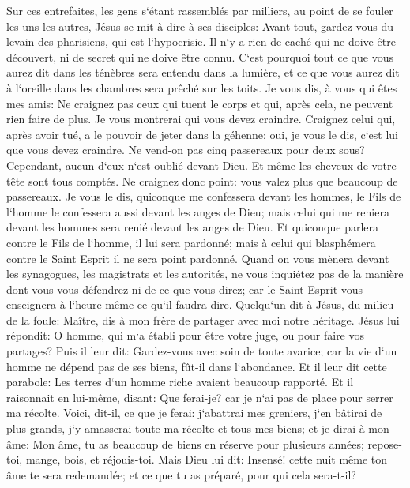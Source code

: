 \verse Sur ces entrefaites, les gens s`étant rassemblés par milliers, au point de se fouler les uns les autres, Jésus se mit à dire à ses disciples: Avant tout, gardez-vous du levain des pharisiens, qui est l`hypocrisie. 
\verse Il n`y a rien de caché qui ne doive être découvert, ni de secret qui ne doive être connu. 
\verse C`est pourquoi tout ce que vous aurez dit dans les ténèbres sera entendu dans la lumière, et ce que vous aurez dit à l`oreille dans les chambres sera prêché sur les toits. 
\verse Je vous dis, à vous qui êtes mes amis: Ne craignez pas ceux qui tuent le corps et qui, après cela, ne peuvent rien faire de plus. 
\verse Je vous montrerai qui vous devez craindre. Craignez celui qui, après avoir tué, a le pouvoir de jeter dans la géhenne; oui, je vous le dis, c`est lui que vous devez craindre. 
\verse Ne vend-on pas cinq passereaux pour deux sous? Cependant, aucun d`eux n`est oublié devant Dieu. 
\verse Et même les cheveux de votre tête sont tous comptés. Ne craignez donc point: vous valez plus que beaucoup de passereaux. 
\verse Je vous le dis, quiconque me confessera devant les hommes, le Fils de l`homme le confessera aussi devant les anges de Dieu; 
\verse mais celui qui me reniera devant les hommes sera renié devant les anges de Dieu. 
\verse Et quiconque parlera contre le Fils de l`homme, il lui sera pardonné; mais à celui qui blasphémera contre le Saint Esprit il ne sera point pardonné. 
\verse Quand on vous mènera devant les synagogues, les magistrats et les autorités, ne vous inquiétez pas de la manière dont vous vous défendrez ni de ce que vous direz; 
\verse car le Saint Esprit vous enseignera à l`heure même ce qu`il faudra dire. 
\verse Quelqu`un dit à Jésus, du milieu de la foule: Maître, dis à mon frère de partager avec moi notre héritage. 
\verse Jésus lui répondit: O homme, qui m`a établi pour être votre juge, ou pour faire vos partages? 
\verse Puis il leur dit: Gardez-vous avec soin de toute avarice; car la vie d`un homme ne dépend pas de ses biens, fût-il dans l`abondance. 
\verse Et il leur dit cette parabole: Les terres d`un homme riche avaient beaucoup rapporté. 
\verse Et il raisonnait en lui-même, disant: Que ferai-je? car je n`ai pas de place pour serrer ma récolte. 
\verse Voici, dit-il, ce que je ferai: j`abattrai mes greniers, j`en bâtirai de plus grands, j`y amasserai toute ma récolte et tous mes biens; 
\verse et je dirai à mon âme: Mon âme, tu as beaucoup de biens en réserve pour plusieurs années; repose-toi, mange, bois, et réjouis-toi. 
\verse Mais Dieu lui dit: Insensé! cette nuit même ton âme te sera redemandée; et ce que tu as préparé, pour qui cela sera-t-il? 
